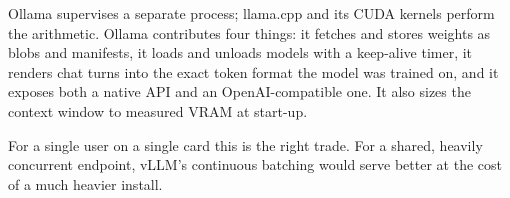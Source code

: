 Ollama supervises a separate  process; llama.cpp and its CUDA
kernels perform the arithmetic. Ollama contributes four things: it fetches and
stores weights as blobs and manifests, it loads and unloads models with a
keep-alive timer, it renders chat turns into the exact token format the model
was trained on, and it exposes both a native API and an OpenAI-compatible one.
It also sizes the context window to measured VRAM at start-up.

For a single user on a single card this is the right trade. For a shared,
heavily concurrent endpoint, vLLM's continuous batching would serve better at
the cost of a much heavier install.
